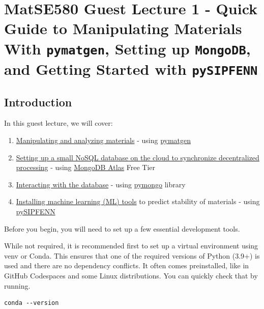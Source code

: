 \chapter{MatSE580 Guest Lecture 1 - Quick Guide to Manipulating Materials With \texttt{pymatgen}, Setting up \texttt{MongoDB}, and Getting Started with \texttt{pySIPFENN}} 
\label{chap:pysipfenntutorial1} 

\hypertarget{introduction}{%
\section{Introduction}\label{pysipfenntutorial:introduction}}

In this guest lecture, we will cover: 

\begin{enumerate}
    \item \protect\hyperlink{Manipulating-and-analyzing-materials}{Manipulating and analyzing materials} - using \href{https://github.com/materialsproject/pymatgen}{pymatgen}

    \item \protect\hyperlink{Setting-up-MongoDB}{Setting up a small NoSQL database on the cloud to synchronize decentralized processing} - using \href{https://www.mongodb.com/atlas}{MongoDB Atlas} Free Tier 

    \item \protect\hyperlink{pymongo}{Interacting with the database} - using \href{https://github.com/mongodb/mongo-python-driver}{pymongo} library

    \item \protect\hyperlink{pysipfenn-install}{Installing machine learning (ML) tools} to predict stability of materials - using \href{https://pysipfenn.readthedocs.io/en/stable/}{pySIPFENN}
\end{enumerate}

Before you begin, you will need to set up a few essential development
tools.

While not required, it is recommended first to set up a virtual
environment using venv or Conda. This ensures that one of the required
versions of Python (3.9+) is used and there are no dependency conflicts.
It often comes preinstalled, like in GitHub Codespaces and some Linux
distributions. You can quickly check that by running.

\begin{verbatim}
conda --version
\end{verbatim}

